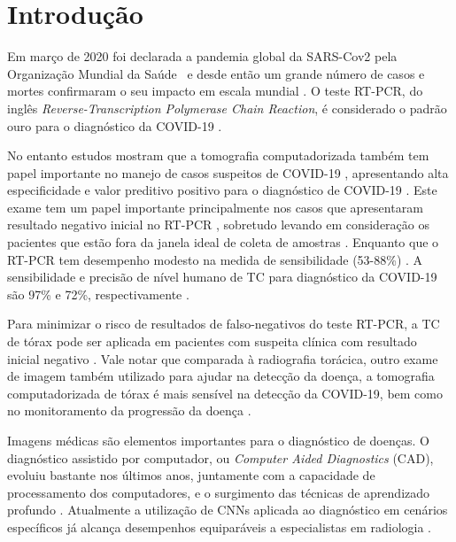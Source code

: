 \chapter{Introdução} \label{cap:cap_introducao}

Em março de 2020 foi declarada a pandemia global da SARS-Cov2 pela Organização Mundial da Saúde~\cite{world2020director} e desde então um grande número de casos e mortes confirmaram o seu impacto em escala mundial \cite{WorldHealthOrganization2020CoronavirusReports}. O teste RT-PCR, do inglês \textit{Reverse-Transcription Polymerase Chain Reaction}, é considerado o padrão ouro para o diagnóstico da COVID-19 \cite{oliveira2020sars}.

No entanto estudos mostram que a tomografia computadorizada também tem papel importante no manejo de casos suspeitos de COVID-19 \cite{he2020diagnostic}, apresentando alta especificidade e valor preditivo positivo para o diagnóstico de COVID-19 \cite{santos2020initial}. Este exame tem um papel importante principalmente nos casos que apresentaram resultado negativo inicial no RT-PCR \cite{fang2020sensitivity}, sobretudo levando em consideração os pacientes que estão fora da janela ideal de coleta de amostras \cite{fonseca2021tomografia}. Enquanto que o RT-PCR tem desempenho modesto na medida de sensibilidade (53-88\%) \cite{kovacs2020sensitivity}. A sensibilidade e precisão de nível humano de TC para diagnóstico da COVID-19 são 97\% e 72\%, respectivamente \cite{caruso2020chest}. 

Para minimizar o risco de resultados de falso-negativos do teste RT-PCR, a TC de tórax pode ser aplicada em pacientes com suspeita clínica com resultado inicial negativo \cite{he2020diagnostic}. Vale notar que comparada à radiografia torácica, outro exame de imagem também utilizado para ajudar na detecção da doença, a tomografia computadorizada de tórax é mais sensível na detecção da COVID-19, bem como no monitoramento da progressão da doença \cite{wong2020frequency}.

Imagens médicas são elementos importantes para o diagnóstico de doenças. O diagnóstico assistido por computador, ou \textit{Computer Aided Diagnostics} (CAD), evoluiu bastante nos últimos anos, juntamente com a capacidade de processamento dos computadores, e o surgimento das técnicas de aprendizado profundo \cite{goodfellow2016deep}.  Atualmente a utilização de CNNs aplicada ao diagnóstico em cenários específicos já alcança desempenhos equiparáveis a especialistas em radiologia \cite{gulshan2016development, esteva2017dermatologist}.

